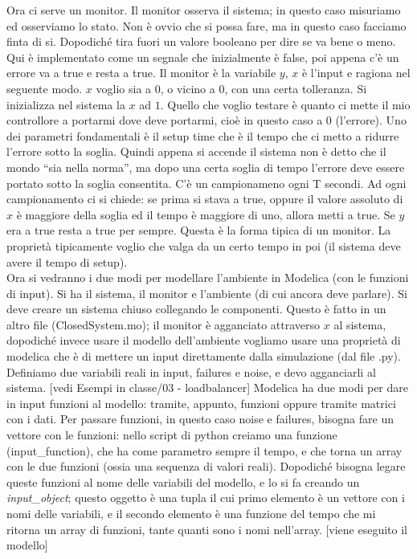 \documentclass[a4paper, 11pt]{article}
\begin{document}
Ora ci serve un monitor. Il monitor osserva il sistema; in questo caso misuriamo ed osserviamo lo stato. Non è ovvio che si possa fare, ma in questo caso facciamo finta di si. Dopodiché tira fuori un valore booleano per dire se va bene o meno. Qui è implementato come un segnale che inizialmente è false, poi appena c'è un errore va a true e resta a true. Il monitor è la variabile $y$, $x$ è l'input e ragiona nel seguente modo. $x$ voglio sia a 0, o vicino a 0, con una certa tolleranza. Si inizializza nel sistema la $x$ ad $1$. Quello che voglio testare è quanto ci mette il mio controllore a portarmi dove deve portarmi, cioè in questo caso a 0 (l'errore). Uno dei parametri fondamentali è il setup time che è il tempo che ci metto a ridurre l'errore sotto la soglia. Quindi appena si accende il sistema non è detto che il mondo ``sia nella norma'', ma dopo una certa soglia di tempo l'errore deve essere portato sotto la soglia consentita. C'è un campionameno ogni T secondi. Ad ogni campionamento ci si chiede: se prima si stava a true, oppure il valore assoluto di $x$ è maggiore della soglia ed il tempo è maggiore di uno, allora metti a true. Se $y$ era a true resta a true per sempre. Questa è la forma tipica di un monitor. La proprietà tipicamente voglio che valga da un certo tempo in poi (il sistema deve avere il tempo di setup).\\

Ora si vedranno i due modi per modellare l'ambiente in Modelica (con le funzioni di input). Si ha il sistema, il monitor e l'ambiente (di cui ancora deve parlare). Si deve creare un sistema chiuso collegando le componenti. Questo è fatto in un altro file (ClosedSystem.mo); il monitor è agganciato attraverso $x$ al sistema, dopodiché invece usare il modello dell'ambiente vogliamo usare una proprietà di modelica che è di mettere un input direttamente dalla simulazione (dal file .py). Definiamo due variabili reali in input, failures e noise, e devo agganciarli al sistema. [vedi Esempi in classe/03 - loadbalancer] Modelica ha due modi per dare in input funzioni al modello: tramite, appunto, funzioni oppure tramite matrici con i dati. Per passare funzioni, in questo caso noise e failures, bisogna fare un vettore con le funzioni: nello script di python creiamo una funzione (input\_function), che ha come parametro sempre il tempo, e che torna un array con le due funzioni (ossia una sequenza di valori reali). Dopodiché bisogna legare queste funzioni al nome delle variabili del modello, e lo si fa creando un \emph{input\_object}; questo oggetto è una tupla il cui primo elemento è un vettore con i nomi delle variabili, e il secondo elemento è una funzione del tempo che mi ritorna un array di funzioni, tante quanti sono i nomi nell'array. [viene eseguito il modello]
\end{document}
